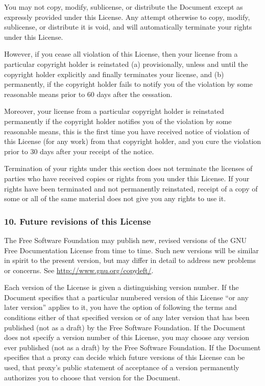 \documentclass[a4paper,openany]{book}
\begin{document}
\begin{results}
You may not copy, modify, sublicense, or distribute the Document
except as expressly provided under this License. Any attempt
otherwise to copy, modify, sublicense, or distribute it is void, and
will automatically terminate your rights under this License.

However, if you cease all violation of this License, then your license
from a particular copyright holder is reinstated (a) provisionally,
unless and until the copyright holder explicitly and finally
terminates your license, and (b) permanently, if the copyright holder
fails to notify you of the violation by some reasonable means prior to
60 days after the cessation.

Moreover, your license from a particular copyright holder is
reinstated permanently if the copyright holder notifies you of the
violation by some reasonable means, this is the first time you have
received notice of violation of this License (for any work) from that
copyright holder, and you cure the violation prior to 30 days after
your receipt of the notice.

Termination of your rights under this section does not terminate the
licenses of parties who have received copies or rights from you under
this License. If your rights have been terminated and not permanently
reinstated, receipt of a copy of some or all of the same material does
not give you any rights to use it.

\subsubsection*{10. Future revisions of this License}

The Free Software Foundation may publish new, revised versions
of the GNU Free Documentation License from time to time. Such new
versions will be similar in spirit to the present version, but may
differ in detail to address new problems or concerns. See
\url{http://www.gnu.org/copyleft/}.

Each version of the License is given a distinguishing version number.
If the Document specifies that a particular numbered version of this
License ``or any later version'' applies to it, you have the option of
following the terms and conditions either of that specified version or
of any later version that has been published (not as a draft) by the
Free Software Foundation. If the Document does not specify a version
number of this License, you may choose any version ever published (not
as a draft) by the Free Software Foundation. If the Document
specifies that a proxy can decide which future versions of this
License can be used, that proxy's public statement of acceptance of a
version permanently authorizes you to choose that version for the
Document.


\end{results}
\end{document}
